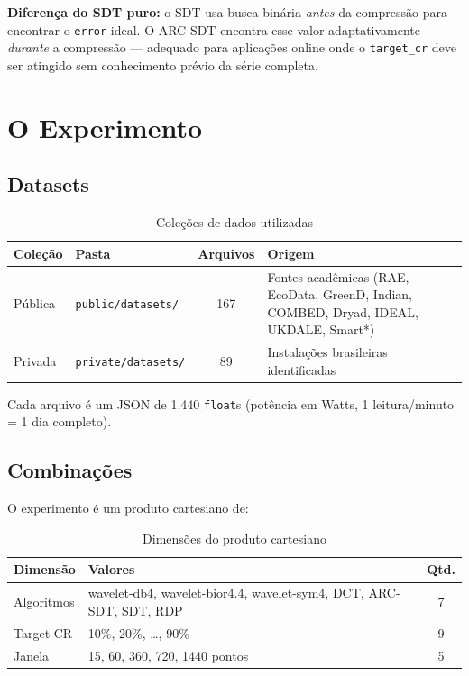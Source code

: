 \documentclass[12pt, a4paper]{article}
\begin{document}
\textbf{Diferença do SDT puro:} o SDT usa busca binária \emph{antes} da compressão para encontrar o \texttt{error} ideal. O ARC-SDT encontra esse valor adaptativamente \emph{durante} a compressão — adequado para aplicações online onde o \texttt{target\_cr} deve ser atingido sem conhecimento prévio da série completa.

\section{O Experimento}

\subsection{Datasets}

\begin{table}[H]
\centering
\caption{Coleções de dados utilizadas}
\begin{tabular}{llcp{6cm}}
\toprule
\textbf{Coleção} & \textbf{Pasta} & \textbf{Arquivos} & \textbf{Origem} \\
\midrule
Pública  & \texttt{public/datasets/}  & 167 & Fontes acadêmicas (RAE, EcoData, GreenD, Indian, COMBED, Dryad, IDEAL, UKDALE, Smart*) \\
Privada  & \texttt{private/datasets/} & 89  & Instalações brasileiras identificadas \\
\bottomrule
\end{tabular}
\end{table}

Cada arquivo é um JSON de 1.440 \texttt{float}s (potência em Watts, 1 leitura/minuto = 1 dia completo).

\subsection{Combinações}

O experimento é um produto cartesiano de:

\begin{table}[H]
\centering
\caption{Dimensões do produto cartesiano}
\begin{tabular}{llc}
\toprule
\textbf{Dimensão} & \textbf{Valores} & \textbf{Qtd.} \\
\midrule
Algoritmos  & wavelet-db4, wavelet-bior4.4, wavelet-sym4, DCT, ARC-SDT, SDT, RDP & 7 \\
Target CR   & 10\%, 20\%, \ldots, 90\% & 9 \\
Janela      & 15, 60, 360, 720, 1440 pontos & 5 \\
\bottomrule
\end{tabular}
\end{table}
\end{document}
